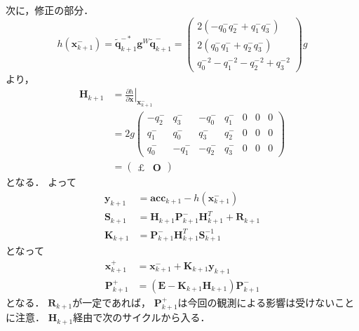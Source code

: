 次に，修正の部分．
\begin{equation}
  h(\boldsymbol{x}_{k+1}^{-}) = \tilde{\boldsymbol{q}}_{k+1}^{-\ast} \boldsymbol{g}^{W} \tilde{\boldsymbol{q}}_{k+1}^{-} =
  \begin{pmatrix}
    2\left(- q_0^{-} q_2^{-} + q_1^{-} q_3^{-}\right)\\
    2\left(q_0^{-} q_1^{-} + q_2^{-} q_3^{-}\right)\\
    {q_0^{-}}^2 - {q_1^{-}}^2 - {q_2^{-}}^2 + {q_3^{-}}^2
  \end{pmatrix}
  g
\end{equation}
より，
\begin{align}
  \boldsymbol{H}_{k+1} &= \left. \frac{\partial h}{\partial \boldsymbol{x}}\right|_{\boldsymbol{x}_{k+1}^{-}}\\
  &=
  2g
  \begin{pmatrix}
    -q_2^{-} &  q_3^{-} & -q_0^{-} &  q_1^{-} & 0 & 0 & 0\\
     q_1^{-} &  q_0^{-} &  q_3^{-} &  q_2^{-} & 0 & 0 & 0\\
     q_0^{-} & -q_1^{-} & -q_2^{-} &  q_3^{-} & 0 & 0 & 0
  \end{pmatrix}\\
  &=
  \begin{pmatrix}
    \pounds & \boldsymbol{O}
  \end{pmatrix}
\end{align}
となる．
よって
\begin{align}
  \boldsymbol{y}_{k+1} &= \boldsymbol{acc}_{k+1} - h(\boldsymbol{x}_{k+1}^{-})\\
  \boldsymbol{S}_{k+1} &= \boldsymbol{H}_{k+1} \boldsymbol{P}_{k+1}^{-} \boldsymbol{H}_{k+1}^{T} + \boldsymbol{R}_{k+1}\\
  \boldsymbol{K}_{k+1} &= \boldsymbol{P}_{k+1}^{-} \boldsymbol{H}_{k+1}^{T} \boldsymbol{S}_{k+1}^{-1}
\end{align}
となって
\begin{align}
  \boldsymbol{x}_{k+1}^{+} &= \boldsymbol{x}_{k+1}^{-} + \boldsymbol{K}_{k+1} \boldsymbol{y}_{k+1}\\
  \boldsymbol{P}_{k+1}^{+} &= \left(\boldsymbol{E} - \boldsymbol{K}_{k+1} \boldsymbol{H}_{k+1}\right) \boldsymbol{P}_{k+1}^{-}
\end{align}
となる．
$\boldsymbol{R}_{k+1}$が一定であれば，
$\boldsymbol{P}_{k+1}^{+}$は今回の観測による影響は受けないことに注意．
$\boldsymbol{H}_{k+1}$経由で次のサイクルから入る．

